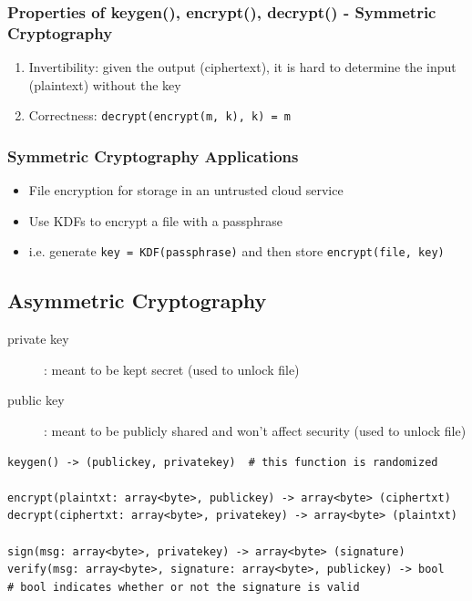 \documentclass[letterpaper,12pt]{article}
\begin{document}
\subsubsection{Properties of keygen(), encrypt(), decrypt() - Symmetric Cryptography}
\begin{enumerate}
 \item Invertibility: given the output (ciphertext), it is hard to determine the input (plaintext) without the key
 \item Correctness: \lstinline{decrypt(encrypt(m, k), k) = m}
\end{enumerate}

\subsubsection{Symmetric Cryptography Applications}
\begin{itemize}
 \item File encryption for storage in an untrusted cloud service
 \item Use KDFs to encrypt a file with a passphrase
 \item i.e. generate \lstinline{key = KDF(passphrase)} and then store \lstinline{encrypt(file, key)}
\end{itemize}

\subsection{Asymmetric Cryptography}
\begin{description}
 \item[private key]: meant to be kept secret (used to unlock file)
 \item[public key]: meant to be publicly shared and won't affect security (used to unlock file)
\end{description}

\begin{lstlisting}
keygen() -> (publickey, privatekey)  # this function is randomized

encrypt(plaintxt: array<byte>, publickey) -> array<byte> (ciphertxt)
decrypt(ciphertxt: array<byte>, privatekey) -> array<byte> (plaintxt)

sign(msg: array<byte>, privatekey) -> array<byte> (signature)
verify(msg: array<byte>, signature: array<byte>, publickey) -> bool
# bool indicates whether or not the signature is valid
\end{lstlisting}
\end{document}
